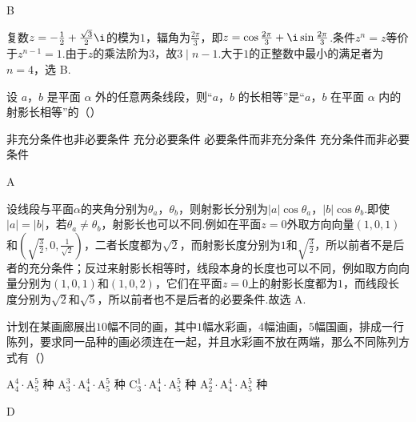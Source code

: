 \begin{answer}
B
\end{answer}

\begin{solution}
复数\(z=-\frac{1}{2}+\frac{\sqrt3}{2}\i\)的模为\(1\)，辐角为\(\frac{2\pi}{3}\)，即\(z=\cos\frac{2\pi}{3}+\i\sin\frac{2\pi}{3}\).条件\(z^n=z\)等价于\(z^{n-1}=1\).由于\(z\)的乘法阶为\(3\)，故\(3\mid n-1\).大于\(1\)的正整数中最小的满足者为\(n=4\)，选 B.
\end{solution}

\begin{problem}
设 \(a\)，\(b\) 是平面 \(\alpha\) 外的任意两条线段，则“\(a\)，\(b\) 的长相等”是“\(a\)，\(b\) 在平面 \(\alpha\) 内的射影长相等”的（\quad）

\choices
    {非充分条件也非必要条件}
    {充分必要条件}
    {必要条件而非充分条件}
    {充分条件而非必要条件}
\end{problem}

\begin{answer}
A
\end{answer}

\begin{solution}
设线段与平面\(\alpha\)的夹角分别为\(\theta_a\)，\(\theta_b\)，则射影长分别为\(|a|\cos\theta_a\)，\(|b|\cos\theta_b\).即使\(|a|=|b|\)，若\(\theta_a\ne\theta_b\)，射影长也可以不同.例如在平面\(z=0\)外取方向向量\((1,0,1)\)和\(\left(\sqrt{\frac32},0,\frac{1}{\sqrt2}\right)\)，二者长度都为\(\sqrt2\)，而射影长度分别为\(1\)和\(\sqrt{\frac32}\)，所以前者不是后者的充分条件；反过来射影长相等时，线段本身的长度也可以不同，例如取方向向量分别为\((1,0,1)\)和\((1,0,2)\)，它们在平面\(z=0\)上的射影长度都为\(1\)，而线段长度分别为\(\sqrt2\)和\(\sqrt5\)，所以前者也不是后者的必要条件.故选 A.
\end{solution}

\begin{problem}
计划在某画廊展出\(10\)幅不同的画，其中\(1\)幅水彩画，\(4\)幅油画，\(5\)幅国画，排成一行陈列，要求同一品种的画必须连在一起，并且水彩画不放在两端，那么不同陈列方式有（\quad）

\choices
    {\(\mathrm A_4^4 \cdot \mathrm A_5^5\) 种}
    {\(\mathrm A_3^3 \cdot \mathrm A_4^4 \cdot \mathrm A_5^5\) 种}
    {\(\mathrm C_3^1 \cdot \mathrm A_4^4 \cdot \mathrm A_5^5\) 种}
    {\(\mathrm A_2^2 \cdot \mathrm A_4^4 \cdot \mathrm A_5^5\) 种}
\end{problem}

\begin{answer}
D
\end{answer}

